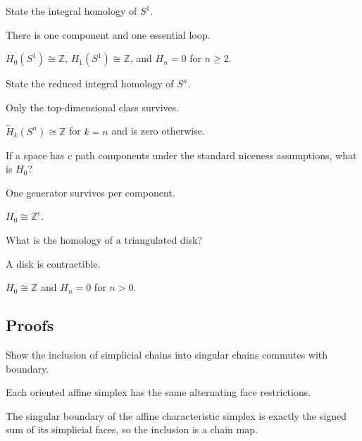 \begin{exercise}\label{exr:viii17-ped-02}
State the integral homology of $S^1$.
\end{exercise}
\begin{hint}
There is one component and one essential loop.
\end{hint}
\begin{solution}
$H_0(S^1)\cong\mathbb Z$, $H_1(S^1)\cong\mathbb Z$, and $H_n=0$ for $n\ge2$.
\end{solution}

\begin{exercise}\label{exr:viii17-ped-03}
State the reduced integral homology of $S^n$.
\end{exercise}
\begin{hint}
Only the top-dimensional class survives.
\end{hint}
\begin{solution}
$\widetilde H_k(S^n)\cong\mathbb Z$ for $k=n$ and is zero otherwise.
\end{solution}

\begin{exercise}[Disconnected $H_0$]\label{exr:viii17-ped-04}
If a space has $c$ path components under the standard niceness assumptions, what is $H_0$?
\end{exercise}
\begin{hint}
One generator survives per component.
\end{hint}
\begin{solution}
$H_0\cong\mathbb Z^c$.
\end{solution}

\begin{exercise}\label{exr:viii17-ped-05}
What is the homology of a triangulated disk?
\end{exercise}
\begin{hint}
A disk is contractible.
\end{hint}
\begin{solution}
$H_0\cong\mathbb Z$ and $H_n=0$ for $n>0$.
\end{solution}

\subsection*{Proofs}

\begin{exercise}\label{exr:viii17-ped-06}
Show the inclusion of simplicial chains into singular chains commutes with boundary.
\end{exercise}
\begin{hint}
Each oriented affine simplex has the same alternating face restrictions.
\end{hint}
\begin{solution}
The singular boundary of the affine characteristic simplex is exactly the signed sum of its simplicial faces, so the inclusion is a chain map.
\end{solution}


